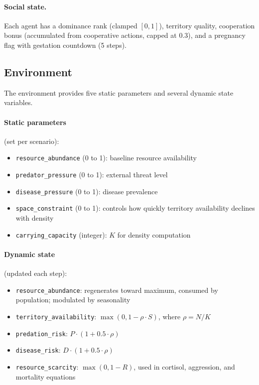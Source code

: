 \paragraph{Social state.}
Each agent has a dominance rank (clamped $[0, 1]$), territory quality, cooperation bonus (accumulated from cooperative actions, capped at 0.3), and a pregnancy flag with gestation countdown (5 steps).

\subsection{Environment}
\label{sec:environment}

The environment provides five static parameters and several dynamic state variables.

\paragraph{Static parameters} (set per scenario):
\begin{itemize}
\item \texttt{resource\_abundance} (0 to 1): baseline resource availability
\item \texttt{predator\_pressure} (0 to 1): external threat level
\item \texttt{disease\_pressure} (0 to 1): disease prevalence
\item \texttt{space\_constraint} (0 to 1): controls how quickly territory availability declines with density
\item \texttt{carrying\_capacity} (integer): $K$ for density computation
\end{itemize}

\paragraph{Dynamic state} (updated each step):
\begin{itemize}
\item \texttt{resource\_abundance}: regenerates toward maximum, consumed by population; modulated by seasonality
\item \texttt{territory\_availability}: $\max(0, 1 - \rho \cdot S)$, where $\rho = N / K$
\item \texttt{predation\_risk}: $P \cdot (1 + 0.5 \cdot \rho)$
\item \texttt{disease\_risk}: $D \cdot (1 + 0.5 \cdot \rho)$
\item \texttt{resource\_scarcity}: $\max(0, 1 - R)$, used in cortisol, aggression, and mortality equations
\end{itemize}

